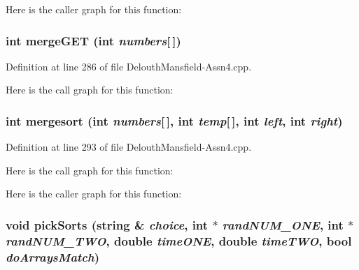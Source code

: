 Here is the caller graph for this function:

\hypertarget{_delouth_mansfield-_assn4_8cpp_a5bf887ba10188a54f08008fba4edd364}{
\subsubsection[{mergeGET}]{\setlength{\rightskip}{0pt plus 5cm}int mergeGET (int {\em numbers}\mbox{[}$\,$\mbox{]})}}
\label{_delouth_mansfield-_assn4_8cpp_a5bf887ba10188a54f08008fba4edd364}


Definition at line 286 of file DelouthMansfield-\/Assn4.cpp.



Here is the call graph for this function:

\hypertarget{_delouth_mansfield-_assn4_8cpp_a5f5d9f539f726c766f4c454c579f2f6d}{
\subsubsection[{mergesort}]{\setlength{\rightskip}{0pt plus 5cm}int mergesort (int {\em numbers}\mbox{[}$\,$\mbox{]}, \/  int {\em temp}\mbox{[}$\,$\mbox{]}, \/  int {\em left}, \/  int {\em right})}}
\label{_delouth_mansfield-_assn4_8cpp_a5f5d9f539f726c766f4c454c579f2f6d}


Definition at line 293 of file DelouthMansfield-\/Assn4.cpp.



Here is the call graph for this function:



Here is the caller graph for this function:

\hypertarget{_delouth_mansfield-_assn4_8cpp_a37091112a4b3fb4a6b3e7e5a395bd888}{
\subsubsection[{pickSorts}]{\setlength{\rightskip}{0pt plus 5cm}void pickSorts (string \& {\em choice}, \/  int $\ast$ {\em randNUM\_\-ONE}, \/  int $\ast$ {\em randNUM\_\-TWO}, \/  double {\em timeONE}, \/  double {\em timeTWO}, \/  bool {\em doArraysMatch})}}
\label{_delouth_mansfield-_assn4_8cpp_a37091112a4b3fb4a6b3e7e5a395bd888}


